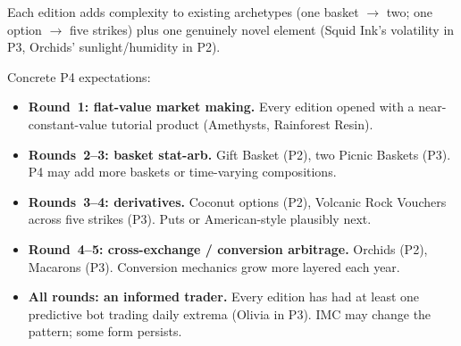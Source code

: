 \noindent Each edition adds complexity to existing archetypes
(one basket $\to$ two; one option $\to$ five strikes) plus one
genuinely novel element (Squid Ink's volatility in P3, Orchids'
sunlight/humidity in P2).

Concrete P4 expectations:

\begin{itemize}
  \item \textbf{Round~1: flat-value market making.}  Every edition
        opened with a near-constant-value tutorial product
        (Amethysts, Rainforest Resin).

  \item \textbf{Rounds~2--3: basket stat-arb.}  Gift Basket (P2),
        two Picnic Baskets (P3).  P4 may add more baskets or
        time-varying compositions.

  \item \textbf{Rounds~3--4: derivatives.}  Coconut options (P2),
        Volcanic Rock Vouchers across five strikes (P3).  Puts or
        American-style plausibly next.

  \item \textbf{Round~4--5: cross-exchange / conversion arbitrage.}
        Orchids (P2), Macarons (P3).  Conversion mechanics grow
        more layered each year.

  \item \textbf{All rounds: an informed trader.}  Every edition
        has had at least one predictive bot trading daily extrema
        (Olivia in P3).  IMC may change the pattern; some form
        persists.
\end{itemize}

